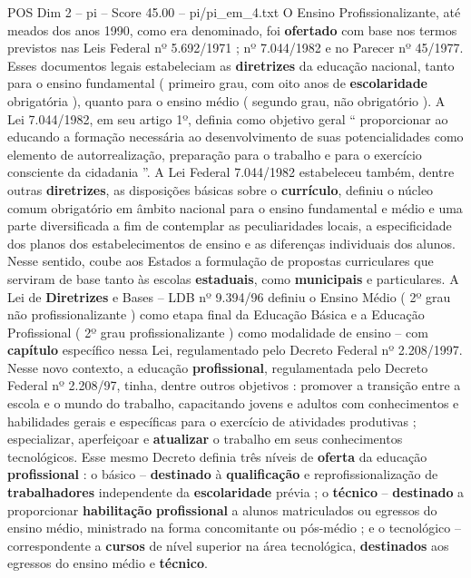 \begin{textsample}{POS Dim 2 – pi – Score 45.00 – pi/pi\_em\_4.txt}
O Ensino Profissionalizante, até meados dos anos 1990, como era denominado, foi \textbf{ofertado} com base nos termos previstos nas Leis Federal nº 5.692/1971 ; nº 7.044/1982 e no Parecer nº 45/1977.
Esses documentos legais estabeleciam as \textbf{diretrizes} da educação nacional, tanto para o ensino fundamental ( primeiro grau, com oito anos de \textbf{escolaridade} obrigatória ), quanto para o ensino médio ( segundo grau, não obrigatório ).
A Lei 7.044/1982, em seu artigo 1º, definia como objetivo geral “ proporcionar ao educando a formação necessária ao desenvolvimento de suas potencialidades como elemento de autorrealização, preparação para o trabalho e para o exercício consciente da cidadania ”.
A Lei Federal 7.044/1982 estabeleceu também, dentre outras \textbf{diretrizes}, as disposições básicas sobre o \textbf{currículo}, definiu o núcleo comum obrigatório em âmbito nacional para o ensino fundamental e médio e uma parte diversificada a fim de contemplar as peculiaridades locais, a especificidade dos planos dos estabelecimentos de ensino e as diferenças individuais dos alunos.
Nesse sentido, coube aos Estados a formulação de propostas curriculares que serviram de base tanto às escolas \textbf{estaduais}, como \textbf{municipais} e particulares.
A Lei de \textbf{Diretrizes} e Bases – LDB nº 9.394/96 definiu o Ensino Médio ( 2º grau não profissionalizante ) como etapa final da Educação Básica e a Educação Profissional ( 2º grau profissionalizante ) como modalidade de ensino – com \textbf{capítulo} específico nessa Lei, regulamentado pelo Decreto Federal nº 2.208/1997.
Nesse novo contexto, a educação \textbf{profissional}, regulamentada pelo Decreto Federal nº 2.208/97, tinha, dentre outros objetivos : promover a transição entre a escola e o mundo do trabalho, capacitando jovens e adultos com conhecimentos e habilidades gerais e específicas para o exercício de atividades produtivas ; especializar, aperfeiçoar e \textbf{atualizar} o trabalho em seus conhecimentos tecnológicos.
Esse mesmo Decreto definia três níveis de \textbf{oferta} da educação \textbf{profissional} : o básico – \textbf{destinado} à \textbf{qualificação} e reprofissionalização de \textbf{trabalhadores} independente da \textbf{escolaridade} prévia ; o \textbf{técnico} – \textbf{destinado} a proporcionar \textbf{habilitação} \textbf{profissional} a alunos matriculados ou egressos do ensino médio, ministrado na forma concomitante ou pós-médio ; e o tecnológico – correspondente a \textbf{cursos} de nível superior na área tecnológica, \textbf{destinados} aos egressos do ensino médio e \textbf{técnico}.

\end{textsample}
